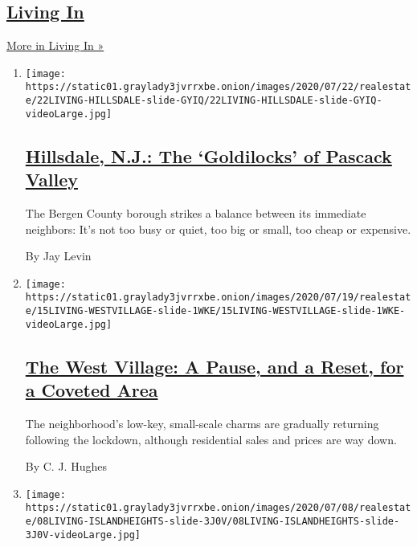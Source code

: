 \hypertarget{living-in-1}{%
\subsection{\texorpdfstring{\href{/column/living-in}{Living
In}}{Living In}}\label{living-in-1}}

\href{/column/living-in}{More in Living In »}

\begin{enumerate}
\def\labelenumi{\arabic{enumi}.}
\item
  \texttt{[image: https://static01.graylady3jvrrxbe.onion/images/2020/07/22/realestate/22LIVING-HILLSDALE-slide-GYIQ/22LIVING-HILLSDALE-slide-GYIQ-videoLarge.jpg]}

  \hypertarget{hillsdale-nj-the-goldilocks-of-pascack-valley}{%
  \subsection{\texorpdfstring{\href{/2020/07/22/realestate/hillsdale-nj-pascack-valley.html}{Hillsdale,
  N.J.: The `Goldilocks' of Pascack
  Valley}}{Hillsdale, N.J.: The `Goldilocks' of Pascack Valley}}\label{hillsdale-nj-the-goldilocks-of-pascack-valley}}

  The Bergen County borough strikes a balance between its immediate
  neighbors: It's not too busy or quiet, too big or small, too cheap or
  expensive.

  By Jay Levin
\item
  \texttt{[image: https://static01.graylady3jvrrxbe.onion/images/2020/07/19/realestate/15LIVING-WESTVILLAGE-slide-1WKE/15LIVING-WESTVILLAGE-slide-1WKE-videoLarge.jpg]}

  \hypertarget{the-west-village-a-pause-and-a-reset-for-a-coveted-area}{%
  \subsection{\texorpdfstring{\href{/2020/07/15/realestate/west-village-nyc.html}{The
  West Village: A Pause, and a Reset, for a Coveted
  Area}}{The West Village: A Pause, and a Reset, for a Coveted Area}}\label{the-west-village-a-pause-and-a-reset-for-a-coveted-area}}

  The neighborhood's low-key, small-scale charms are gradually returning
  following the lockdown, although residential sales and prices are way
  down.

  By C. J. Hughes
\item
  \texttt{[image: https://static01.graylady3jvrrxbe.onion/images/2020/07/08/realestate/08LIVING-ISLANDHEIGHTS-slide-3J0V/08LIVING-ISLANDHEIGHTS-slide-3J0V-videoLarge.jpg]}


\end{enumerate}
